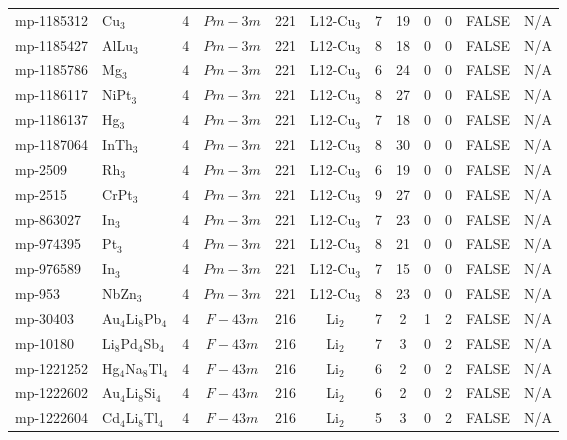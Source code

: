 {\begin{longtable}{llcccccccccc}
    mp-1185312 & Cu$_{3}$ & 4     & $Pm-3m$ & 221   & L12-Cu$_{3}$ & 7     & 19    & 0     & 0     & FALSE & N/A \\
    mp-1185427 & AlLu$_{3}$ & 4     & $Pm-3m$ & 221   & L12-Cu$_{3}$ & 8     & 18    & 0     & 0     & FALSE & N/A \\
    mp-1185786 & Mg$_{3}$ & 4     & $Pm-3m$ & 221   & L12-Cu$_{3}$ & 6     & 24    & 0     & 0     & FALSE & N/A \\
    mp-1186117 & NiPt$_{3}$ & 4     & $Pm-3m$ & 221   & L12-Cu$_{3}$ & 8     & 27    & 0     & 0     & FALSE & N/A \\
    mp-1186137 & Hg$_{3}$ & 4     & $Pm-3m$ & 221   & L12-Cu$_{3}$ & 7     & 18    & 0     & 0     & FALSE & N/A \\
    mp-1187064 & InTh$_{3}$ & 4     & $Pm-3m$ & 221   & L12-Cu$_{3}$ & 8     & 30    & 0     & 0     & FALSE & N/A \\
    mp-2509 & Rh$_{3}$ & 4     & $Pm-3m$ & 221   & L12-Cu$_{3}$ & 6     & 19    & 0     & 0     & FALSE & N/A \\
    mp-2515 & CrPt$_{3}$ & 4     & $Pm-3m$ & 221   & L12-Cu$_{3}$ & 9     & 27    & 0     & 0     & FALSE & N/A \\
    mp-863027 & In$_{3}$ & 4     & $Pm-3m$ & 221   & L12-Cu$_{3}$ & 7     & 23    & 0     & 0     & FALSE & N/A \\
    mp-974395 & Pt$_{3}$ & 4     & $Pm-3m$ & 221   & L12-Cu$_{3}$ & 8     & 21    & 0     & 0     & FALSE & N/A \\
    mp-976589 & In$_{3}$ & 4     & $Pm-3m$ & 221   & L12-Cu$_{3}$ & 7     & 15    & 0     & 0     & FALSE & N/A \\
    mp-953 & NbZn$_{3}$ & 4     & $Pm-3m$ & 221   & L12-Cu$_{3}$ & 8     & 23    & 0     & 0     & FALSE & N/A \\
    mp-30403 & Au$_{4}$Li$_{8}$Pb$_{4}$ & 4     & $F-43m$ & 216   & Li$_{2}$ & 7     & 2     & 1     & 2     & FALSE & N/A \\
    mp-10180 & Li$_{8}$Pd$_{4}$Sb$_{4}$ & 4     & $F-43m$ & 216   & Li$_{2}$ & 7     & 3     & 0     & 2     & FALSE & N/A \\
    mp-1221252 & Hg$_{4}$Na$_{8}$Tl$_{4}$ & 4     & $F-43m$ & 216   & Li$_{2}$ & 6     & 2     & 0     & 2     & FALSE & N/A \\
    mp-1222602 & Au$_{4}$Li$_{8}$Si$_{4}$ & 4     & $F-43m$ & 216   & Li$_{2}$ & 6     & 2     & 0     & 2     & FALSE & N/A \\
    mp-1222604 & Cd$_{4}$Li$_{8}$Tl$_{4}$ & 4     & $F-43m$ & 216   & Li$_{2}$ & 5     & 3     & 0     & 2     & FALSE & N/A \\

\end{longtable}}
